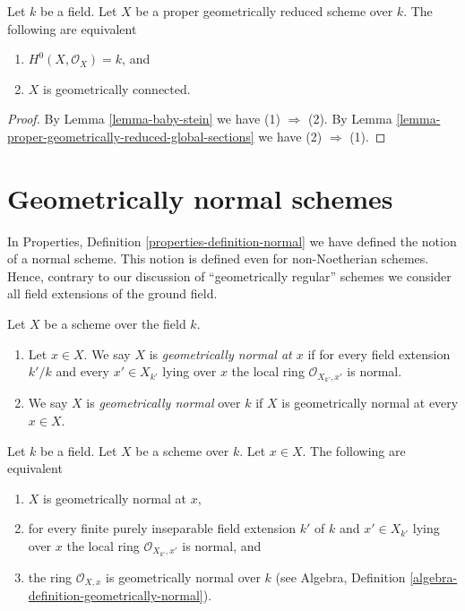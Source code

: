 \begin{lemma}
\label{lemma-geometrically-reduced-stein}
Let $k$ be a field. Let $X$ be a proper geometrically reduced scheme over $k$.
The following are equivalent
\begin{enumerate}
\item $H^0(X, \mathcal{O}_X) = k$, and
\item $X$ is geometrically connected.
\end{enumerate}
\end{lemma}

\begin{proof}
By Lemma \ref{lemma-baby-stein} we have (1) $\Rightarrow$ (2).
By Lemma \ref{lemma-proper-geometrically-reduced-global-sections}
we have (2) $\Rightarrow$ (1).
\end{proof}




\section{Geometrically normal schemes}
\label{section-geometrically-normal}

\noindent
In Properties, Definition \ref{properties-definition-normal}
we have defined the notion of a normal scheme.
This notion is defined even for non-Noetherian
schemes. Hence, contrary to our discussion of
``geometrically regular'' schemes we consider all
field extensions of the ground field.

\begin{definition}
\label{definition-geometrically-normal}
Let $X$ be a scheme over the field $k$.
\begin{enumerate}
\item Let $x \in X$. We say $X$ is
{\it geometrically normal at $x$} if for every
field extension $k'/k$ and every $x' \in X_{k'}$ lying over $x$
the local ring $\mathcal{O}_{X_{k'}, x'}$ is normal.
\item We say $X$ is {\it geometrically normal} over $k$ if $X$
is geometrically normal at every $x \in X$.
\end{enumerate}
\end{definition}

\begin{lemma}
\label{lemma-geometrically-normal-at-point}
Let $k$ be a field.
Let $X$ be a scheme over $k$.
Let $x \in X$.
The following are equivalent
\begin{enumerate}
\item $X$ is geometrically normal at $x$,
\item for every finite purely inseparable field extension $k'$ of $k$
and $x' \in X_{k'}$ lying over $x$ the local ring
$\mathcal{O}_{X_{k'}, x'}$ is normal, and
\item the ring $\mathcal{O}_{X, x}$ is geometrically
normal over $k$ (see
Algebra, Definition \ref{algebra-definition-geometrically-normal}).
\end{enumerate}
\end{lemma}

